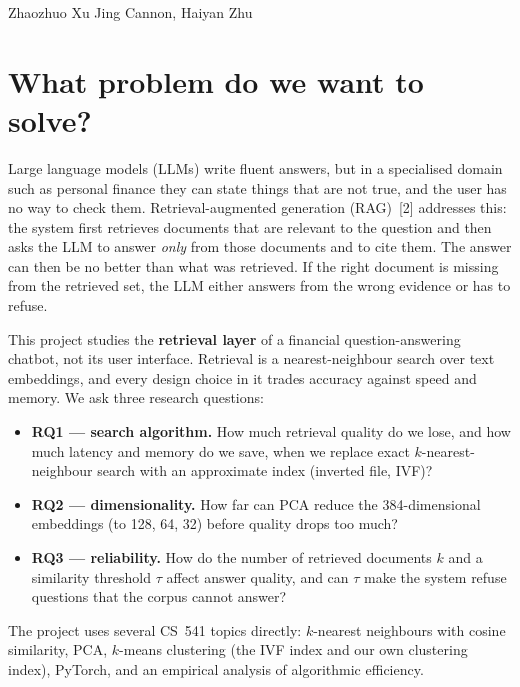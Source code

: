 \documentclass[11pt]{article}
\begin{document}


{Zhaozhuo Xu}
{Jing Cannon, Haiyan Zhu}

\section{What problem do we want to solve?}

Large language models (LLMs) write fluent answers, but in a specialised domain such as personal finance they
can state things that are not true, and the user has no way to check them. Retrieval-augmented generation
(RAG)~[2] addresses this: the system first retrieves documents that are relevant to the question and then asks
the LLM to answer \emph{only} from those documents and to cite them. The answer can then be no better than what
was retrieved. If the right document is missing from the retrieved set, the LLM either answers from the wrong
evidence or has to refuse.

This project studies the \textbf{retrieval layer} of a financial question-answering chatbot, not its user
interface. Retrieval is a nearest-neighbour search over text embeddings, and every design choice in it trades
accuracy against speed and memory. We ask three research questions:
\begin{itemize}[leftmargin=*]
\item \textbf{RQ1 --- search algorithm.} How much retrieval quality do we lose, and how much latency and
memory do we save, when we replace exact $k$-nearest-neighbour search with an approximate index (inverted file,
IVF)?
\item \textbf{RQ2 --- dimensionality.} How far can PCA reduce the 384-dimensional embeddings (to 128, 64, 32)
before quality drops too much?
\item \textbf{RQ3 --- reliability.} How do the number of retrieved documents $k$ and a similarity threshold
$\tau$ affect answer quality, and can $\tau$ make the system refuse questions that the corpus cannot answer?
\end{itemize}
The project uses several CS~541 topics directly: $k$-nearest neighbours with cosine similarity, PCA,
$k$-means clustering (the IVF index and our own clustering index), PyTorch, and an empirical analysis of
algorithmic efficiency.
\end{document}
